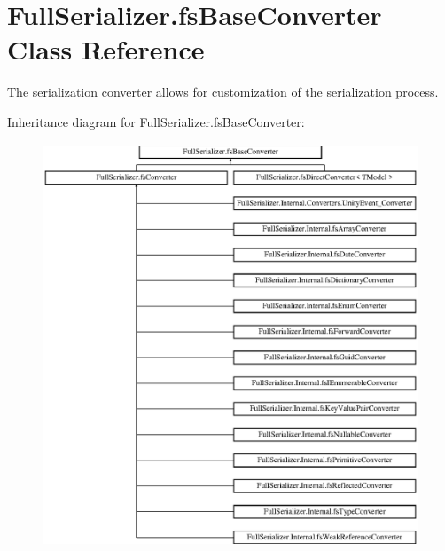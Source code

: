 \hypertarget{class_full_serializer_1_1fs_base_converter}{}\section{Full\+Serializer.\+fs\+Base\+Converter Class Reference}
\label{class_full_serializer_1_1fs_base_converter}


The serialization converter allows for customization of the serialization process.  


Inheritance diagram for Full\+Serializer.\+fs\+Base\+Converter\+:\begin{figure}[H]
\begin{center}
\leavevmode
\includegraphics[height=12.000000cm]{class_full_serializer_1_1fs_base_converter}
\end{center}
\end{figure}
